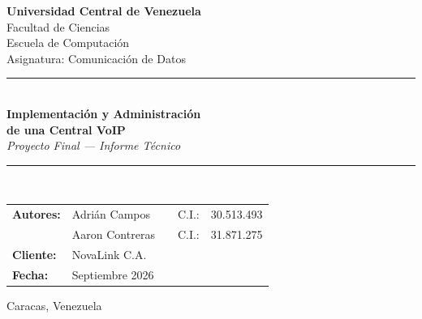 \documentclass[12pt,a4paper]{article}
\begin{document}

\begin{titlepage}
    \centering
    \vspace*{0.5cm}

    {\large\bfseries Universidad Central de Venezuela}\\[0.2cm]
    {\large Facultad de Ciencias}\\[0.2cm]
    {\large Escuela de Computación}\\[0.2cm]
    {\normalsize Asignatura: Comunicación de Datos}\\[2.5cm]

    {\color{ucvblue}\rule{\linewidth}{1.8pt}}\\[0.6cm]
    {\huge\bfseries Implementación y Administración\\[0.3cm] de una Central VoIP}\\[0.5cm]
    {\large\itshape Proyecto Final --- Informe Técnico}\\[0.4cm]
    {\color{ucvblue}\rule{\linewidth}{1.8pt}}\\[3cm]

    \begin{minipage}{0.85\linewidth}
        \renewcommand{\arraystretch}{1.4}
        \begin{tabular}{@{}lllll@{}}
            \textbf{Autores:} & Adrián Campos    & \hspace{0.5cm} & C.I.: & 30.513.493 \\
                              & Aaron Contreras  & \hspace{0.5cm} & C.I.: & 31.871.275 \\[0.3cm]
            \textbf{Cliente:} & \multicolumn{4}{l}{NovaLink C.A.} \\
            \textbf{Fecha:}   & \multicolumn{4}{l}{Septiembre 2026} \\
        \end{tabular}
    \end{minipage}

    \vfill

    {\normalsize Caracas, Venezuela}
    \vspace*{0.5cm}
\end{titlepage}
\end{document}
